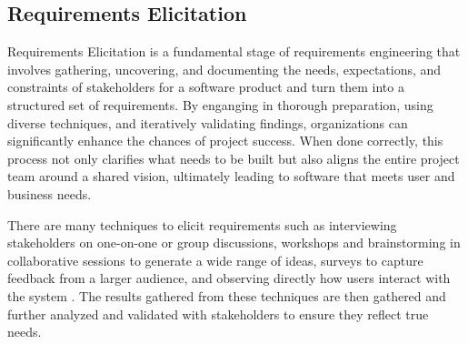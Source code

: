 


\subsection{Requirements Elicitation}
Requirements Elicitation is a fundamental stage of requirements engineering that involves gathering, uncovering, and documenting the needs, expectations, and constraints of stakeholders for a software product and turn them into a 
structured set of requirements. By enganging in thorough preparation, using diverse techniques, and iteratively validating findings, organizations can significantly enhance the chances of project success. When done correctly, this
process not only clarifies what needs to be built but also aligns the entire project team around a shared vision, ultimately leading to software that meets user and business needs. \cite{nuseibeh2000requirements}

There are many techniques to elicit requirements such as interviewing stakeholders on one-on-one or group discussions, workshops and brainstorming in collaborative sessions to generate a wide range of ideas, surveys to capture
feedback from a larger audience, and observing directly how users interact with the system \cite{324822, nuseibeh2000requirements}. The results gathered from these techniques are then gathered and further analyzed and validated 
with stakeholders to ensure they reflect true needs. 




